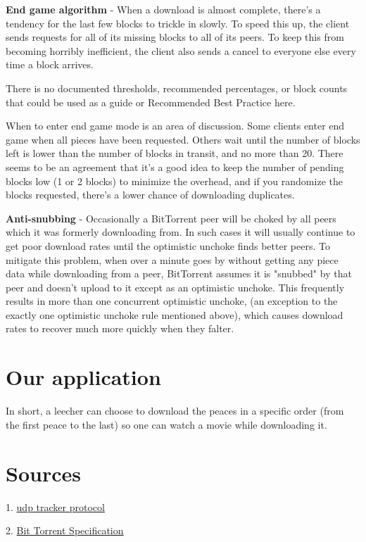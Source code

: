\documentclass[11pt]{article}
\begin{document}
  \begin{flushleft}

    \textbf{End game algorithm} - When a download is almost complete, there's a tendency for the last few blocks to trickle in slowly. To speed this up, the client sends requests for all of its missing blocks to all of its peers. To keep this from becoming horribly inefficient, the client also sends a cancel to everyone else every time a block arrives.

  \end{flushleft}
  \begin{flushleft}

    There is no documented thresholds, recommended percentages, or block counts that could be used as a guide or Recommended Best Practice here.

  \end{flushleft}
  \begin{flushleft}

    When to enter end game mode is an area of discussion. Some clients enter end game when all pieces have been requested. Others wait until the number of blocks left is lower than the number of blocks in transit, and no more than 20. There seems to be an agreement that it's a good idea to keep the number of pending blocks low (1 or 2 blocks) to minimize the overhead, and if you randomize the blocks requested, there's a lower chance of downloading duplicates.

  \end{flushleft}
  \begin{flushleft}

    \textbf{Anti-snubbing} - Occasionally a BitTorrent peer will be choked by all peers which it was formerly downloading from. In such cases it will usually continue to get poor download rates until the optimistic unchoke finds better peers. To mitigate this problem, when over a minute goes by without getting any piece data while downloading from a peer, BitTorrent assumes it is "snubbed" by that peer and doesn't upload to it except as an optimistic unchoke. This frequently results in more than one concurrent optimistic unchoke, (an exception to the exactly one optimistic unchoke rule mentioned above), which causes download rates to recover much more quickly when they falter.

  \end{flushleft}
  \section*{Our application}
  \begin{flushleft}

    In short, a leecher can choose to download the peaces in a specific order (from the first peace to the last) so one can watch a movie while downloading it.

  \end{flushleft}
  \section*{Sources}
  \begin{flushleft}
    1. \href{http://www.rasterbar.com/products/libtorrent/udp_tracker_protocol.html}{udp tracker protocol}


    2. \href{https://wiki.theory.org/index.php/BitTorrentSpecification}{Bit Torrent Specification}
  \end{flushleft}
\end{document}
